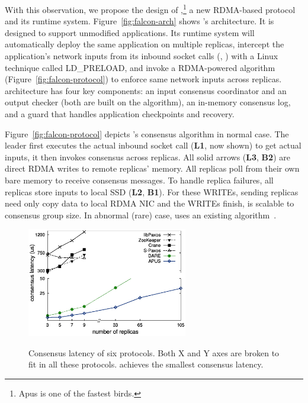 With this observation, we propose the design of \falcon,\footnote{Apus is one 
of the fastest birds.} a new RDMA-based \paxos 
protocol and its runtime system. Figure~\ref{fig:falcon-arch} shows \falcon's 
architecture. It is designed to support unmodified applications. Its runtime 
system will automatically deploy the same application on multiple replicas, 
intercept the application's network inputs from its inbound socket calls (\eg, 
\recv) with a Linux technique called LD\_PRELOAD, and invoke a RDMA-powered 
algorithm (Figure~\ref{fig:falcon-protocol}) to enforce same network inputs 
across replicas. \falcon architecture has four key components: an input 
consensus coordinator and an output checker (both are built on the algorithm), 
an in-memory consensus log, and a guard that handles application checkpoints 
and recovery.

Figure~\ref{fig:falcon-protocol} depicts \falcon's consensus algorithm in 
normal case. The leader first executes the actual inbound socket call 
(\textbf{L1}, now shown) to get actual inputs, it then invokes consensus across 
replicas. All solid arrows (\textbf{L3}, \textbf{B2}) are direct RDMA writes 
to remote replicas' memory. All replicas poll from their own bare memory to 
receive consensus messages. To handle replica failures, all replicas store 
inputs to local SSD (\textbf{L2}, \textbf{B1}). For these WRITEs, sending 
replicas need only copy data to local RDMA NIC and the WRITEs finish, 
\falcon is scalable to consensus group size. In abnormal (rare) case, \falcon 
uses an existing algorithm~\cite{paxos:practical}.




\begin{figure}
  \vspace{-.1in}
  \includegraphics[width=7cm]{figures/traditional_paxos_latency.ps}\\
  \vspace{-.3in}
  \caption{Consensus latency of six \paxos protocols. Both X and Y axes are 
broken to fit in all these protocols. \falcon achieves the smallest consensus 
latency.}
  \label{fig:scalability}
\end{figure}

